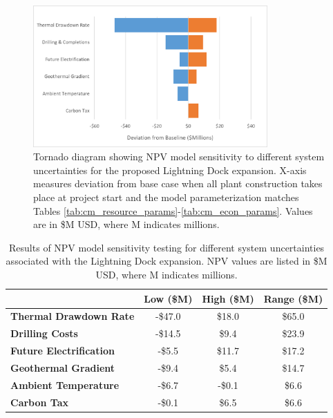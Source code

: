 \begin{figure}%
\centering
\includegraphics[width=0.8\textwidth]{templates/images/Figure-Tornado.png}
\singlespacing
\caption[Sensitivity testing tornado diagram]{Tornado diagram showing NPV model sensitivity to different system uncertainties for the proposed Lightning Dock expansion. X-axis measures deviation from base case when all plant construction takes place at project start and the model parameterization matches Tables \ref{tab:cm_resource_params}-\ref{tab:cm_econ_params}. Values are in \$M USD, where M indicates millions.}
\label{fig:tornado}
\end{figure}

\begin{table}%
\centering
\begin{tabular}{|l|c|c|c|}
\hline
\textbf{} & \textbf{Low (\$M)} & \textbf{High (\$M)} & \textbf{Range (\$M)} \\ \hline
\textbf{Thermal Drawdown Rate} & -\$47.0 & \$18.0 & \$65.0 \\ \hline
\textbf{Drilling Costs} & -\$14.5 & \$9.4 & \$23.9 \\ \hline
\textbf{Future Electrification} & -\$5.5 & \$11.7 & \$17.2 \\ \hline
\textbf{Geothermal Gradient} & -\$9.4 & \$5.4 & \$14.7 \\ \hline
\textbf{Ambient Temperature} & -\$6.7 & -\$0.1 & \$6.6 \\ \hline
\textbf{Carbon Tax} & -\$0.1 & \$6.5 & \$6.6 \\ \hline
\end{tabular}
\caption[Sensitivity testing results]{Results of NPV model sensitivity testing for different system uncertainties associated with the Lightning Dock expansion. NPV values are listed in \$M USD, where M indicates millions.}
\label{tab:tornado_table}
\end{table}

